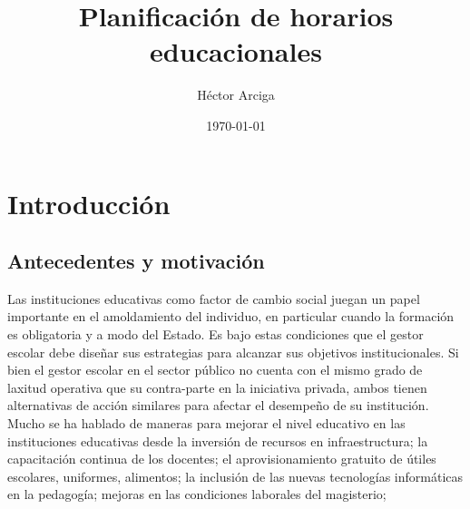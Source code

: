 \documentclass[draft,12pt,headsepline,footsepline,paper=letter]{scrreprt}
\begin{document}
\title{Planificación de horarios educacionales}
\author{Héctor Arciga}
\date{\today}

\maketitle


\begin{abstract}
 
\end{abstract}

\begin{spacing}{1}
\tableofcontents
\glsaddall 
\printglossaries
\listoffigures
\listoftables
\end{spacing}


\chapter{Introducción}


\section{Antecedentes y motivación}

Las instituciones educativas como factor de cambio social juegan un papel importante en el amoldamiento del individuo, en particular cuando la formación es obligatoria y a modo del Estado. Es bajo estas condiciones que el gestor escolar debe diseñar sus estrategias para alcanzar sus objetivos institucionales. 
Si bien el gestor escolar en el sector público no cuenta con el mismo grado de laxitud operativa que su contra-parte en la iniciativa privada, ambos tienen alternativas de acción similares para afectar el desempeño de su institución.
Mucho se ha hablado de maneras para mejorar el nivel educativo en las instituciones educativas desde la inversión de recursos en infraestructura; la capacitación continua de los docentes; el aprovisionamiento gratuito de útiles escolares, uniformes, alimentos; la  inclusión de las nuevas tecnologías informáticas en la pedagogía; mejoras en las condiciones laborales del magisterio; 
\end{document}
